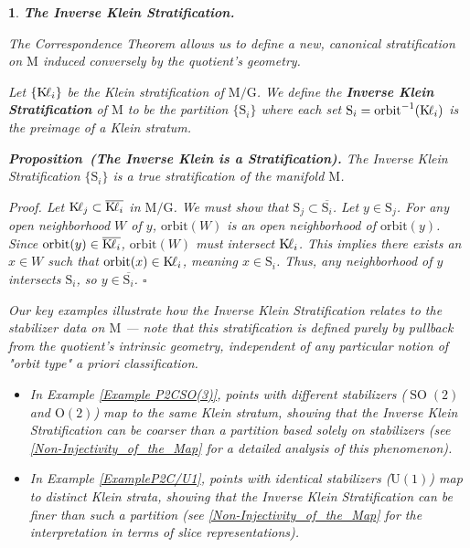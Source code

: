 \documentclass[10pt,reqno,letterpaper,twoside]{amsart}
\theoremstyle{article}
\newtheorem{article}{}
\def\artlabel[#1]{\textbf{#1.}}
\newenvironment{proposition}[1]%
{\noindent\textbf{Proposition#1.} \it}%
{}
\renewenvironment{proof}%
{\noindent\textit{Proof.}}%
{\nolinebreak\hfill $\square$}
\def \G{\mathrm G}
\def \K{\mathrm K}
\def \M{\mathrm M}
\def \O{\mathrm O}
\def \S{\mathrm S}
\def \U{\mathrm U}
\DeclareMathOperator{\Kl}{{\K\hspace{-1pt}\ell}}
\DeclareMathOperator{\SO}{SO}
\newcommand{\closure}[1]{\overline{#1}}
\newcommand{\orbit}{{\mathrm{orbit}}}
\def \O{\mathrm O}
\begin{document}
  
  \begin{article}
    \artlabel[The Inverse Klein Stratification]
    \label{art:Inverse_Klein_Stratification}
    
    The Correspondence Theorem allows us to define a new,
    canonical stratification on $\M$ induced conversely by the quotient's geometry.
    
    Let $\{\Kl_i\}$ be the Klein stratification of $\M/\G$.
    We define the \textbf{Inverse Klein Stratification} of $\M$ to be the partition $\{\S_i\}$ where each set $\S_i = \orbit^{-1}(\Kl_i)$ is the preimage of a Klein stratum.
    
    \begin{proposition}{~(The Inverse Klein is a Stratification)}
      The Inverse Klein Stratification $\{\S_i\}$ is a true stratification of the manifold $\M$.
    \end{proposition}
    
    \begin{proof}
      Let $\Kl_j \subset \closure{\Kl_i}$ in $\M/\G$.
      We must show that $\S_j \subset \closure{\S_i}$. Let $y \in \S_j$.
      For any open neighborhood $W$ of $y$,
      $\orbit(W)$ is an open neighborhood of $\orbit(y)$.
      Since $\orbit(y) \in \closure{\Kl_i}$, $\orbit(W)$ must intersect $\Kl_i$.
      This implies there exists an $x \in W$ such that $\orbit(x) \in \Kl_i$,
      meaning $x \in \S_i$.
      Thus,
      any neighborhood of $y$ intersects $\S_i$,
      so $y \in \closure{\S_i}$.
    \end{proof}
    
    Our key examples illustrate how the Inverse Klein Stratification relates to the stabilizer data on $\M$
    — note that this stratification is defined purely by pullback from the quotient's intrinsic geometry,
    independent of any particular notion of "orbit type" \emph{a priori} classification.
    
    \begin{itemize}
      \item[--] In Example \ref{Example P2CSO(3)},
      points with different stabilizers ($\SO(2)$ and $\O(2)$) map to the same Klein stratum,
      showing that the Inverse Klein Stratification can be coarser than a partition based solely on stabilizers
      (see \textsection\ref{Non-Injectivity_of_the_Map} for a detailed analysis of this phenomenon).
      \item[--] In Example \ref{ExampleP2C/U1},
      points with identical stabilizers ($\U(1)$) map to distinct Klein strata,
      showing that the Inverse Klein Stratification can be finer than such a partition
      (see \textsection\ref{Non-Injectivity_of_the_Map} for the interpretation in terms of slice representations).
    \end{itemize}
    

\end{article}
\end{document}
